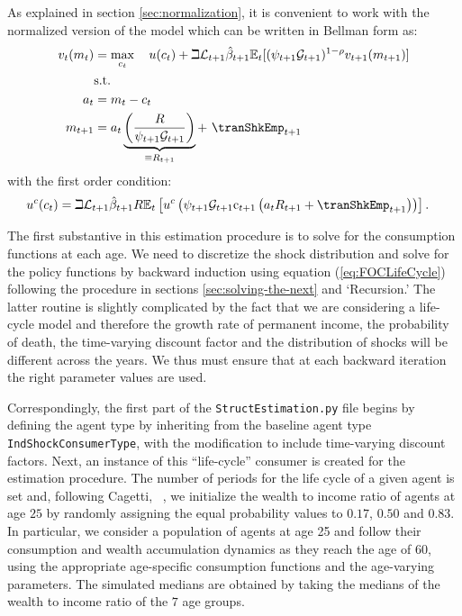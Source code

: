 \documentclass[titlepage, headings=optiontotocandhead]{econtex}
\begin{document}
As explained in section \ref{sec:normalization}, it is convenient to work with the normalized version of the model which can be written in Bellman form as:
  \begin{equation*}\begin{gathered}\begin{aligned}
        v_{t}(m_{t})  & = \max_{{c}_{t}}~~~ u(c_{t})+\beth\mathcal{L}_{t+1}\hat{\beta}_{t+1}
        {\mathbb{E}}_{t}[(\psi_{t+1}\mathcal{G}_{t+1})^{1-\rho}v_{t+1}(m_{t+1})]   \\
        & \text{s.t.}   \nonumber \\
        a_{t}    & = m_{t}-c_{t} \nonumber
        \\      m_{t+1}  & = a_{t}\underbrace{\left(\frac{R}{\psi_{t+1}\mathcal{G}_{t+1}}\right)}_{\equiv R_{t+1}}+ ~\tranShkEmp_{t+1}
      \end{aligned}\end{gathered}\end{equation*}
with the first order condition:
  \begin{equation}\begin{gathered}\begin{aligned}
        u^{c}(c_{t}) & = \beth\mathcal{L}_{t+1}\hat{\beta}_{t+1}R {\mathbb{E}}_{t}\left[u^{c}\left(\psi_{t+1}\mathcal{G}_{t+1}\mathrm{c}_{t+1}\left(a_{t}R_{t+1}+\tranShkEmp_{t+1}\right)\right)\right]\label{eq:FOCLifeCycle}
        .
      \end{aligned}\end{gathered}\end{equation}

The first substantive {\move} in this estimation procedure is
to solve for the consumption functions at each age. We need to
discretize the shock distribution and solve for the policy
functions by backward induction using equation (\ref{eq:FOCLifeCycle})
following the procedure in sections \ref{sec:solving-the-next} and
`Recursion.' The latter routine
is slightly complicated by the fact that we are considering a
life-cycle model and therefore the growth rate of permanent income,
the probability of death, the time-varying discount factor and the
distribution of shocks will be different across the years. We thus
must ensure that at each backward iteration the right parameter
values are used.

Correspondingly, the first part of the \texttt{StructEstimation.py} file begins by defining the agent type by inheriting from the baseline agent type \texttt{IndShockConsumerType}, with the modification to include time-varying discount factors. Next, an instance of this ``life-cycle'' consumer is created for the estimation procedure.  The number of periods for the life cycle of a given agent is set and, following Cagetti, ~\citeyearpar{cagettiWprofiles}, we initialize the wealth to income ratio of agents at age $25$ by randomly assigning the equal probability values to $0.17$, $0.50$ and $0.83$. In particular, we consider a population of agents at age 25 and follow their consumption and wealth accumulation dynamics as they reach the age of $60$, using the appropriate age-specific consumption functions and the age-varying parameters. The simulated medians are obtained by taking the medians of the wealth to income ratio of the $7$ age groups.
\end{document}
